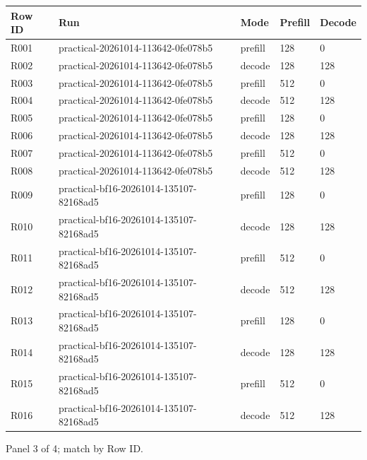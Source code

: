 \documentclass[10pt]{article}
\begin{document}
{\scriptsize\setlength{\tabcolsep}{2pt}
\begin{longtable}{p{}p{}p{}p{}p{}}
Row ID & Run & Mode & Prefill & Decode \\
\hline\endhead
R001 & practical-20261014-113642-0fe078b5 & prefill & 128 & 0 \\
R002 & practical-20261014-113642-0fe078b5 & decode & 128 & 128 \\
R003 & practical-20261014-113642-0fe078b5 & prefill & 512 & 0 \\
R004 & practical-20261014-113642-0fe078b5 & decode & 512 & 128 \\
R005 & practical-20261014-113642-0fe078b5 & prefill & 128 & 0 \\
R006 & practical-20261014-113642-0fe078b5 & decode & 128 & 128 \\
R007 & practical-20261014-113642-0fe078b5 & prefill & 512 & 0 \\
R008 & practical-20261014-113642-0fe078b5 & decode & 512 & 128 \\
R009 & practical-bf16-20261014-135107-82168ad5 & prefill & 128 & 0 \\
R010 & practical-bf16-20261014-135107-82168ad5 & decode & 128 & 128 \\
R011 & practical-bf16-20261014-135107-82168ad5 & prefill & 512 & 0 \\
R012 & practical-bf16-20261014-135107-82168ad5 & decode & 512 & 128 \\
R013 & practical-bf16-20261014-135107-82168ad5 & prefill & 128 & 0 \\
R014 & practical-bf16-20261014-135107-82168ad5 & decode & 128 & 128 \\
R015 & practical-bf16-20261014-135107-82168ad5 & prefill & 512 & 0 \\
R016 & practical-bf16-20261014-135107-82168ad5 & decode & 512 & 128 \\
\end{longtable}}
\par\noindent Panel 3 of 4; match by Row ID.
\end{document}
